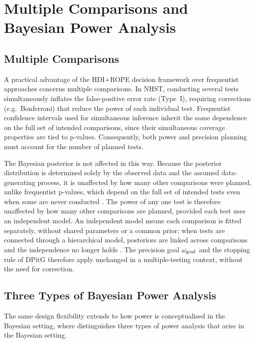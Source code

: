 \section{Multiple Comparisons and Bayesian Power Analysis}\label{app:multiple_comparisons}

\subsection*{Multiple Comparisons}

A practical advantage of the HDI+ROPE decision framework over frequentist approaches concerns
multiple comparisons. In NHST, conducting several tests simultaneously inflates the
false-positive error rate (Type~I), requiring corrections (e.g.\ Bonferroni) that reduce the power of
each individual test. Frequentist confidence intervals used for simultaneous inference inherit the same
dependence on the full set of intended comparisons, since their simultaneous coverage
properties are tied to p-values. Consequently, both power and precision planning must account for the number
of planned tests.

The Bayesian posterior is not affected in this way. Because the posterior distribution
is determined solely by the observed data and the assumed data-generating process, it
is unaffected by how many other comparisons were planned, unlike frequentist
p-values, which depend on the full set of intended tests even when some are never
conducted \citep{gelman2012, kruschke2015doing}.
The power of any one test is therefore unaffected by how many other comparisons are
planned, provided each test uses an independent model.
An independent model means each comparison is fitted separately, without shared
parameters or a common prior; when tests are connected through a hierarchical model,
posteriors are linked across comparisons and the independence no longer holds
\citep{gelman2012}.
The precision goal $\omega_{\rm goal}$ and the stopping rule of DPitG therefore apply
unchanged in a multiple-testing context, without the need for correction.

\subsection*{Three Types of Bayesian Power Analysis}

The same design flexibility extends to how power is conceptualised in the Bayesian
setting, where \citet{kruschke2015doing} distinguishes three types of power analysis that arise in
the Bayesian setting.

